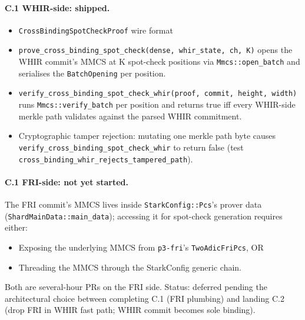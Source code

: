 \paragraph{C.1 WHIR-side: shipped.}
\begin{itemize}
  \item \texttt{CrossBindingSpotCheckProof} wire format
  \item \texttt{prove\_cross\_binding\_spot\_check(dense, whir\_state, ch, K)}
        opens the WHIR commit's MMCS at K spot-check positions via
        \texttt{Mmcs::open\_batch} and serialises the
        \texttt{BatchOpening} per position.
  \item \texttt{verify\_cross\_binding\_spot\_check\_whir(proof, commit, height, width)}
        runs \texttt{Mmcs::verify\_batch} per position and returns
        true iff every WHIR-side merkle path validates against the
        parsed WHIR commitment.
  \item Cryptographic tamper rejection: mutating one merkle path byte
        causes \texttt{verify\_cross\_binding\_spot\_check\_whir} to
        return false (test \texttt{cross\_binding\_whir\_rejects\_tampered\_path}).
\end{itemize}

\paragraph{C.1 FRI-side: not yet started.}
The FRI commit's MMCS lives inside \texttt{StarkConfig::Pcs}'s
prover data (\texttt{ShardMainData::main\_data}); accessing it for
spot-check generation requires either:
\begin{itemize}
  \item Exposing the underlying MMCS from \texttt{p3-fri}'s
        \texttt{TwoAdicFriPcs}, OR
  \item Threading the MMCS through the StarkConfig generic chain.
\end{itemize}
Both are several-hour PRs on the FRI side.  Status: deferred pending
the architectural choice between completing C.1 (FRI plumbing) and
landing C.2 (drop FRI in WHIR fast path; WHIR commit becomes sole
binding).

